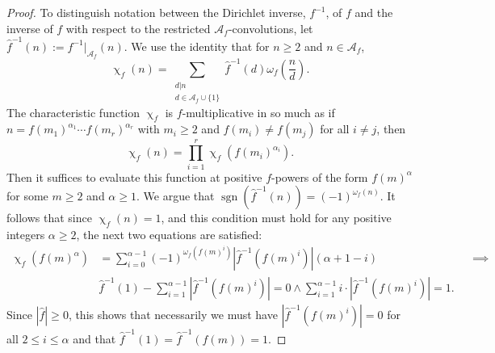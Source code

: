 \documentclass[11pt,reqno,a4letter]{article}
\numberwithin{figure}{section}
\numberwithin{table}{section}
\renewcommand{\chi}{\upchi}
\theoremstyle{plain}
\numberwithin{theorem}{section}
\theoremstyle{definition}
\begin{document}
\begin{proof}
To distinguish notation between the Dirichlet inverse, $f^{-1}$, of $f$ and 
the inverse of $f$ with respect to the restricted $\mathcal{A}_f$-convolutions, 
let $\hat{f}^{-1}(n) := f^{-1}\bigr\rvert_{\mathcal{A}_f}(n)$. 
We use the identity that for $n \geq 2$ and $n \in \mathcal{A}_f$, 
\[
\chi_f(n) = \sum_{\substack{d|n \\ d \in \mathcal{A}_f \cup \{1\}}} 
     \hat{f}^{-1}(d) \omega_f\left(\frac{n}{d}\right). 
\]
The characteristic function $\chi_f$ is $f$-multiplicative in so much as 
if $n = f(m_1)^{\alpha_1} \cdots f(m_r)^{\alpha_r}$ with 
$m_i \geq 2$ and $f(m_i) \neq f(m_j)$ for all $i \neq j$, then 
\[
\chi_f(n) = \prod_{i=1}^{r} \chi_f\left(f(m_i)^{\alpha_i}\right). 
\]
Then it suffices to evaluate this function at positive $f$-powers of the 
form $f(m)^{\alpha}$ for some $m \geq 2$ and $\alpha \geq 1$. 
We argue that $\operatorname{sgn}(\hat{f}^{-1}(n)) = (-1)^{\omega_f(n)}$. 
It follows that since $\chi_f(n) = 1$, and this condition must hold for any 
positive integers $\alpha \geq 2$, the next two equations are satisfied: 
\begin{align*}
\chi_f(f(m)^{\alpha}) & = \sum_{i=0}^{\alpha-1} (-1)^{\omega_f(f(m)^i)} |\hat{f}^{-1}(f(m)^i)| 
     (\alpha+1-i) && \implies \\ & 
     \hat{f}^{-1}(1) - \sum_{i=1}^{\alpha-1} |\hat{f}^{-1}(f(m)^i)| = 0 \wedge 
     \sum_{i=1}^{\alpha-1} i \cdot |\hat{f}^{-1}(f(m)^i)| = 1. 
\end{align*}
Since $|\hat{f}| \geq 0$, this shows that necessarily we must have 
$|\hat{f}^{-1}(f(m)^i)| = 0$ for all $2 \leq i \leq \alpha$ and 
that $\hat{f}^{-1}(1) = \hat{f}^{-1}(f(m)) = 1$. 
\end{proof}
\end{document}

